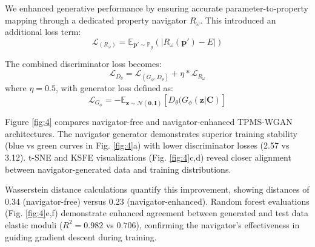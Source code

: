 \documentclass[preprint,review,12pt,authoryear]{elsarticle}
\begin{document}
We enhanced generative performance by ensuring accurate parameter-to-property mapping through a dedicated property navigator $R_\omega$. This introduced an additional loss term:
\begin{equation}
\mathcal{L}_{(R_\omega)}=\mathbb{E}_{\boldsymbol{p}' \sim \mathbb{P}_g}(|R_\omega(\boldsymbol{p}')-E|)
\label{eq:18}
\end{equation}

The combined discriminator loss becomes:
\begin{equation}
\mathcal{L}_{D_\theta} =  \mathcal{L}_{(G_\phi, D_\theta)} + \eta *\mathcal{L}_{R_\omega}
\label{eq:19}
\end{equation}
where $\eta=0.5$, with generator loss defined as:
\begin{equation}
\mathcal{L}_{G_\phi} =  - \mathbb{E}_{\boldsymbol{z}\sim \mathcal{N}(\boldsymbol{0},\boldsymbol{I})} \left[ D_\theta (G_\phi(\boldsymbol{z}|\boldsymbol{C})\right]
\label{eq:20}
\end{equation}

Figure \ref{fig:4} compares navigator-free and navigator-enhanced TPMS-WGAN architectures. The navigator generator demonstrates superior training stability (blue vs green curves in Fig. \ref{fig:4}a) with lower discriminator losses (2.57 vs 3.12). t-SNE and KSFE visualizations (Fig. \ref{fig:4}c,d) reveal closer alignment between navigator-generated data and training distributions.

Wasserstein distance calculations \citep{Villani2008OptimalTO} quantify this improvement, showing distances of 0.34 (navigator-free) versus 0.23 (navigator-enhanced). Random forest evaluations (Fig. \ref{fig:4}e,f) demonstrate enhanced agreement between generated and test data elastic moduli ($R^2=0.982$ vs $0.706$), confirming the navigator's effectiveness in guiding gradient descent during training.
\end{document}
